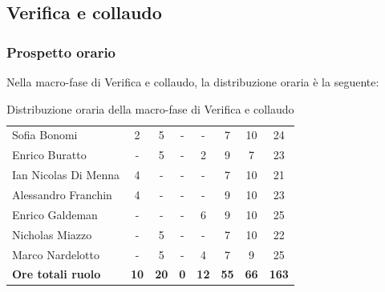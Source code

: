 \documentclass[../piano-di-progetto.tex]{subfiles}
\begin{document}
  \subsection{Verifica e collaudo}

  \subsubsection{Prospetto orario}
  Nella macro-fase di Verifica e collaudo, la distribuzione oraria è la seguente:
  \begin{table}[H]
    \centering
    \begin{tabular}{lccccccc}
      Sofia Bonomi              & 2           & 5           & -          & -           & 7           & 10          & 24           \\
      Enrico Buratto            & -           & 5           & -          & 2           & 9           & 7           & 23           \\
      Ian Nicolas Di Menna      & 4           & -           & -          & -           & 7           & 10          & 21           \\
      Alessandro Franchin       & 4           & -           & -          & -           & 9           & 10          & 23           \\
      Enrico Galdeman           & -           & -           & -          & 6           & 9           & 10          & 25           \\
      Nicholas Miazzo           & -           & 5           & -          & -           & 7           & 10          & 22           \\
      Marco Nardelotto          & -           & 5           & -          & 4           & 7           & 9           & 25           \\
      \textbf{Ore totali ruolo} & \textbf{10} & \textbf{20} & \textbf{0} & \textbf{12} & \textbf{55} & \textbf{66} & \textbf{163} 
    \end{tabular}
    \caption{Distribuzione oraria della macro-fase di Verifica e collaudo}
  \end{table}
\end{document}
